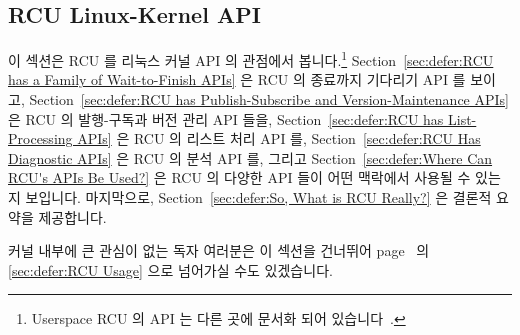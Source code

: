 
\subsection{RCU Linux-Kernel API}
\label{sec:defer:RCU Linux-Kernel API}

이 섹션은 RCU 를 리눅스 커널 API 의 관점에서 봅니다.\footnote{
	Userspace RCU 의 API 는 다른 곳에 문서화 되어
	있습니다~\cite{PaulMcKenney2013LWNURCU}.}
Section~\ref{sec:defer:RCU has a Family of Wait-to-Finish APIs}
은 RCU 의 종료까지 기다리기 API 를 보이고,
Section~\ref{sec:defer:RCU has Publish-Subscribe and Version-Maintenance APIs}
은 RCU 의 발행-구독과 버전 관리 API 들을,
Section~\ref{sec:defer:RCU has List-Processing APIs}
은 RCU 의 리스트 처리 API 를,
Section~\ref{sec:defer:RCU Has Diagnostic APIs}
은 RCU 의 분석 API 를, 그리고
Section~\ref{sec:defer:Where Can RCU's APIs Be Used?}
은 RCU 의 다양한 API 들이 어떤 맥락에서 사용될 수 있는지 보입니다.
마지막으로,
Section~\ref{sec:defer:So, What is RCU Really?}
은 결론적 요약을 제공합니다.

커널 내부에 큰 관심이 없는 독자 여러분은 이 섹션을 건너뛰어
page~\pageref{sec:defer:RCU Usage} 의
\cref{sec:defer:RCU Usage} 으로 넘어가실 수도 있겠습니다.

